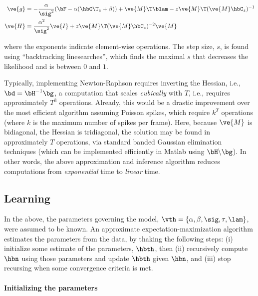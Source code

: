 \begin{subequations} \label{eq:NR}
\begin{align}
\ve{g} &= -\frac{\alpha}{\sig^2}(\bF -\alpha({\hbC\T}_{\zzz} + \beta)) + \ve{M}\T\blam - \zzz \ve{M}\T (\ve{M} \hbC_{\zzz})^{-1} \label{eq:g} \\
\ve{H} &= \frac{\alpha^2}{\sig^2} \ve{I} + \zzz \ve{M}\T (\ve{M} \hbC_{\zzz})^{-2} \ve{M} \label{eq:H}
\end{align}
\end{subequations}

\noindent where the exponents indicate element-wise operations. The step size, $s$, is found using ``backtracking linesearches'', which finds the maximal $s$ that decreases the likelihood and is between $0$ and $1$.

Typically, implementing Newton-Raphson requires inverting the Hessian, i.e., $\bd = \bH^{-1} \bg$, a computation that scales \emph{cubically} with $T$, i.e., requires approximately $T^3$ operations. Already, this would be a drastic improvement over the most efficient algorithm assuming Poisson spikes, which require $k^T$ operations (where $k$ is the maximum number of spikes per frame).  Here, because $\ve{M}$ is bidiagonal, the Hessian is tridiagonal, the solution may be found in approximately $T$ operations, via standard banded Gaussian elimination techniques (which can be implemented efficiently in Matlab using $\bH \backslash \bg$). In other words, the above approximation and inference algorithm reduces computations from \emph{exponential} time to \emph{linear} time. 





\subsection{Learning} \label{sec:learn}

In the above, the parameters governing the model, $\vth=\{\alpha, \beta, \sig, \tau, \lam\}$, were assumed to be known. An approximate expectation-maximization algorithm estimates the parameters from the data, by thaking the following steps: (i) initialize some estimate of the parameters, $\hbth$, then (ii) recursively compute $\hbn$ using those parameters and update $\hbth$ given $\hbn$, and (iii) stop recursing when some convergence criteria is met.  

\paragraph{Initializing the parameters}

